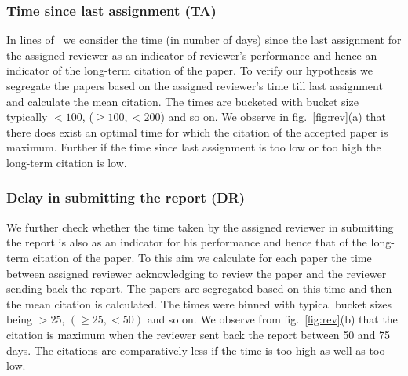 \subsubsection{Time since last assignment (TA)}

In lines of~\cite{sikdar2016anomalies} we consider the time (in number of days) since the last assignment for the assigned reviewer as an indicator of reviewer's performance and hence an indicator of the long-term citation of the paper. To verify our hypothesis we segregate the papers based on the assigned reviewer's time till last assignment and calculate the mean citation. The times are bucketed with bucket size typically $< 100$, ($\geq 100, < 200$) and so on. We observe in fig.~\ref{fig:rev}(a) that there does exist an optimal time for which the citation of the accepted paper is maximum. Further if the time since last assignment is too low or too high the long-term citation is low.   

\subsubsection{Delay in submitting the report (DR)}

We further check whether the time taken by the assigned reviewer in submitting the report is also as an indicator for his performance and hence that of the long-term citation of the paper. To this aim we calculate for each paper the time between assigned reviewer acknowledging to review the paper and the reviewer sending back the report. The papers are segregated based on this time and then the mean citation is calculated. 
The times were binned with typical bucket sizes being $>25$, $(\geq 25, < 50)$ and so on. We observe from fig.~\ref{fig:rev}(b) that the citation is maximum when the reviewer sent back the report between 50 and 75 days. The citations are comparatively less if the time is too high as well as too low. 

\medskip